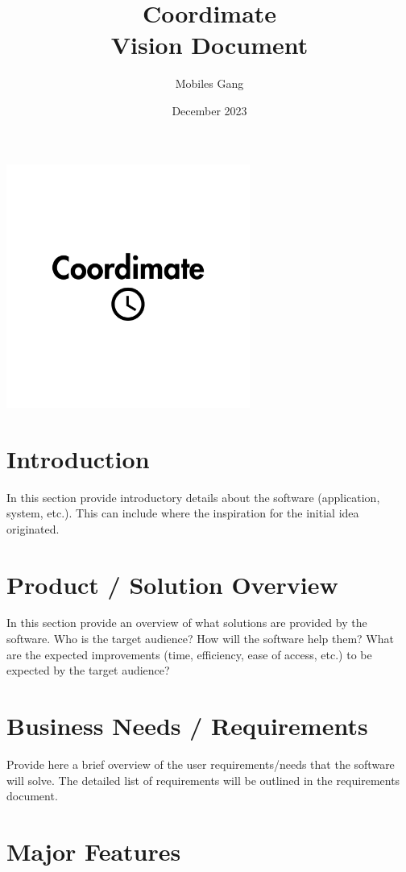 \documentclass{article}
\title{Coordimate\\Vision Document}
\date{December 2023}
\author{Mobiles Gang}
\begin{document}
\maketitle

\begin{center}
\includegraphics[width=8cm]{coordimate-logo}
\end{center}

\section{Introduction}

In this section provide introductory details about the software (application,
system, etc.). This can include where the inspiration for the initial idea
originated.

\section{Product / Solution Overview}

In this section provide an overview of what solutions are provided by the
software. Who is the target audience? How will the software help them? What are
the expected improvements (time, efficiency, ease of access, etc.) to be
expected by the target audience?

\section{Business Needs / Requirements}

Provide here a brief overview of the user requirements/needs that the software
will solve. The detailed list of requirements will be outlined in the
requirements document.

\section{Major Features}
\end{document}
